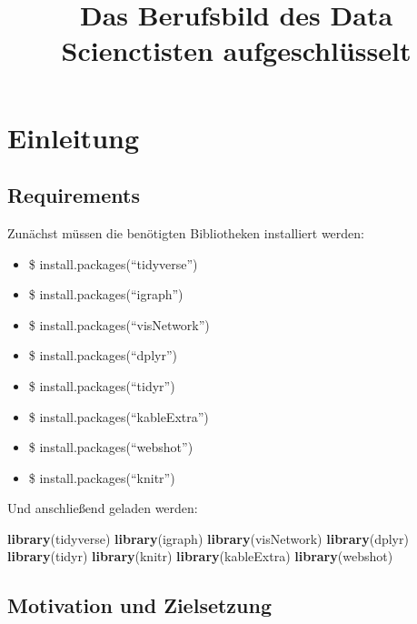 \documentclass[
]{article}
\title{Das Berufsbild des Data Scienctisten aufgeschlüsselt}
\author{}
\date{\vspace{-2.5em}}
\newenvironment{Shaded}{\begin{snugshade}}{\end{snugshade}}
\newcommand{\FunctionTok}[1]{\textcolor[rgb]{0.13,0.29,0.53}{\textbf{#1}}}
\newcommand{\NormalTok}[1]{#1}
\providecommand{\tightlist}{%
  \setlength{\itemsep}{0pt}\setlength{\parskip}{0pt}}
\begin{document}
\maketitle

{
\setcounter{tocdepth}{3}
\tableofcontents
}
\newpage

\section{Einleitung}\label{einleitung}

\subsection{Requirements}\label{requirements}

Zunächst müssen die benötigten Bibliotheken installiert werden:

\begin{itemize}
\tightlist
\item
  \$ install.packages(``tidyverse'')
\item
  \$ install.packages(``igraph'')
\item
  \$ install.packages(``visNetwork'')
\item
  \$ install.packages(``dplyr'')
\item
  \$ install.packages(``tidyr'')
\item
  \$ install.packages(``kableExtra'')
\item
  \$ install.packages(``webshot'')
\item
  \$ install.packages(``knitr'')
\end{itemize}

Und anschließend geladen werden:

\begin{Shaded}
\begin{Highlighting}[]
\FunctionTok{library}\NormalTok{(tidyverse)}
\FunctionTok{library}\NormalTok{(igraph)}
\FunctionTok{library}\NormalTok{(visNetwork)}
\FunctionTok{library}\NormalTok{(dplyr)}
\FunctionTok{library}\NormalTok{(tidyr)}
\FunctionTok{library}\NormalTok{(knitr)}
\FunctionTok{library}\NormalTok{(kableExtra)}
\FunctionTok{library}\NormalTok{(webshot)}
\end{Highlighting}
\end{Shaded}

\subsection{Motivation und
Zielsetzung}\label{motivation-und-zielsetzung}
\end{document}
